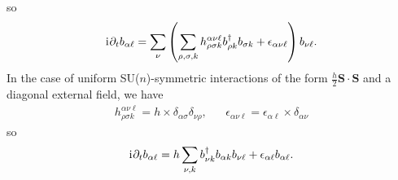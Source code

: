 \documentclass[nofootinbib,twocolumn]{revtex4-2}
\newcommand{\p}[1]{\left(#1\right)} %
\renewcommand{\v}{\bm} %
\renewcommand{\c}{\cdot} %
\renewcommand{\d}{\partial} %
\renewcommand{\i}{\mathrm{i}\mkern1mu} %
\newcommand{\1}{\mathds{1}}
\begin{document}
so
\begin{align}
  \i \d_t b_{\alpha\ell}
  = \sum_\nu \p{\sum_{\rho,\sigma,k}
    h^{\alpha\nu\ell}_{\rho\sigma k} b_{\rho k}^\dag b_{\sigma k}
    + \epsilon_{\alpha\nu\ell}} b_{\nu\ell}.
\end{align}
In the case of uniform SU($n$)-symmetric interactions of the form $\frac{h}{2}\v S\c\v S$ and a diagonal external field, we have
\begin{align}
  h^{\alpha\nu\ell}_{\rho\sigma k}
  = h \times \delta_{\alpha\sigma} \delta_{\nu\rho},
  &&
  \epsilon_{\alpha\nu\ell}
  = \epsilon_{\alpha\ell} \times \delta_{\alpha\nu}
\end{align}
so
\begin{align}
  \i \d_t b_{\alpha\ell}
  = h \sum_{\nu,k} b_{\nu k}^\dag b_{\alpha k} b_{\nu\ell}
  + \epsilon_{\alpha\ell} b_{\alpha\ell}.
\end{align}
\end{document}
